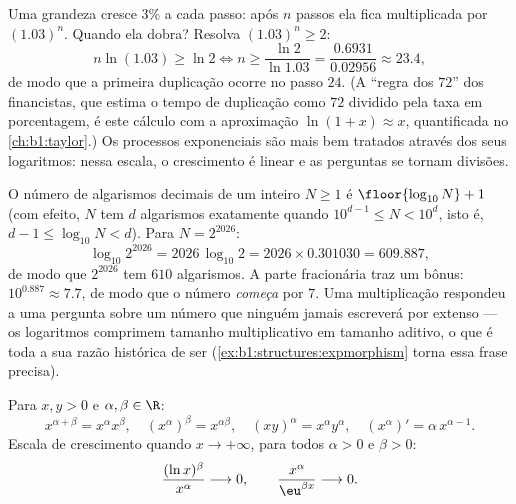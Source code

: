 \begin{example}\label{ex:b1:functions:doubling}
Uma grandeza cresce $3\%$ a cada passo: após $n$ passos ela fica
multiplicada por $(1.03)^n$. Quando ela dobra? Resolva $(1.03)^n
\geq 2$:
\[
n\ln(1.03) \geq \ln2
\iff n \geq \frac{\ln 2}{\ln 1.03}
= \frac{0.6931}{0.02956} \approx 23.4 ,
\]
de modo que a primeira duplicação ocorre no passo $24$. (A
``regra dos $72$'' dos financistas, que estima o tempo de duplicação como
$72$ dividido pela taxa em porcentagem, é este cálculo com
a aproximação $\ln(1 + x) \approx x$, quantificada no
\cref{ch:b1:taylor}.) Os processos
exponenciais são mais bem tratados através dos seus logaritmos: nessa
escala, o crescimento é linear e as perguntas se tornam divisões.
\end{example}

\begin{example}\label{ex:b1:functions:digits}
O número de algarismos decimais de um inteiro $N \geq 1$ é
$\floor{\log_{10} N} + 1$ (com efeito, $N$ tem $d$ algarismos exatamente quando
$10^{d-1} \leq N < 10^d$, isto é, $d - 1 \leq \log_{10}N < d$). Para
$N = 2^{2026}$:
\[
\log_{10} 2^{2026} = 2026\,\log_{10}2
= 2026 \times 0.301030 = 609.887 ,
\]
de modo que $2^{2026}$ tem $610$ algarismos. A parte fracionária traz um
bônus: $10^{0.887} \approx 7.7$, de modo que o número \emph{começa} por
$7$. Uma multiplicação respondeu a uma pergunta sobre um número que
ninguém jamais escreverá por extenso --- os logaritmos comprimem
tamanho multiplicativo em tamanho aditivo, o que é toda a sua razão
histórica de ser (\cref{ex:b1:structures:expmorphism} torna essa frase precisa).
\end{example}

\begin{proposition}\label{prop:b1:functions:powerrules}
Para $x, y > 0$ e $\alpha, \beta \in \R$:
\[
x^{\alpha+\beta} = x^\alpha x^\beta, \quad
(x^\alpha)^\beta = x^{\alpha\beta}, \quad
(xy)^\alpha = x^\alpha y^\alpha, \quad
(x^\alpha)' = \alpha\, x^{\alpha - 1}.
\]
Escala de crescimento quando $x \to +\infty$, para todos $\alpha > 0$ e $\beta > 0$:
\[
\frac{(\ln x)^\beta}{x^\alpha} \longrightarrow 0,
\qquad
\frac{x^\alpha}{\eu^{\beta x}} \longrightarrow 0 .
\]
\end{proposition}

